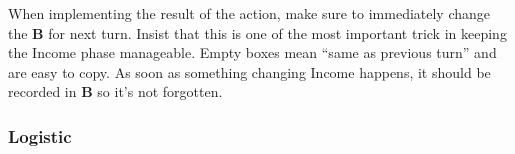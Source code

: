 \aparag When implementing the result of the action, make sure to immediately
change the \EcoRS \textbf{B} for next turn.
\bparag Insist that this is one of the most important trick in keeping the
Income phase manageable.
\bparag Empty boxes mean ``same as previous turn'' and are easy to copy. As
soon as something changing Income happens, it should be recorded in \EcoRS
\textbf{B} so it's not forgotten.

\subsubsection{Logistic}


